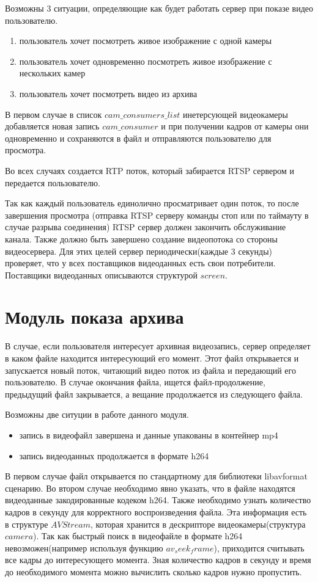 Возможны 3 ситуации, определяющие как будет работать сервер при показе видео пользователю.
\begin{enumerate}
	\item пользователь хочет посмотреть живое изображение с одной камеры
	\item пользователь хочет одновременно посмотреть живое изображение с нескольких камер
	\item пользователь хочет посмотреть видео из архива
\end{enumerate}

В первом случае в список $cam\_consumers\_list$ инетерсующей видеокамеры добавляется новая запись
$cam\_consumer$ и при получении кадров от камеры они одновременно и сохраняются в файл и отправляются
пользователю для просмотра.

Во всех случаях создается RTP поток, который забирается RTSP сервером и передается пользователю.

Так как каждый пользователь единолично просматривает один поток, то после завершения просмотра
(отправка RTSP серверу команды стоп или по таймауту в случае разрыва соединения) RTSP сервер
должен закончить обслуживание канала. Также должно быть завершено создание видеопотока со стороны видеосервера.
Для этих целей сервер периодически(каждые 3 секунды) проверяет, что у всех поставщиков
видеоданных есть свои потребители. Поставщики видеоданных описываются структурой $screen$.

\section{Модуль показа архива}
В случае, если пользователя интересует архивная видеозапись, сервер определяет в каком файле
находится интересующий его момент. Этот файл открывается и запускается новый поток, читающий видео
поток из файла и передающий его пользователю. В случае окончания файла, ищется файл-продолжение,
предыдущий файл закрывается, а вещание продолжается из следующего файла.

Возможны две ситуции в работе данного модуля.

\begin{itemize}
 \item запись в видеофайл завершена и данные упакованы в контейнер mp4
 \item запись видеоданных продолжается в формате h264
\end{itemize}

В первом случае файл открывается по стандартному для библиотеки libavformat сценарию.
Во втором случае необходимо явно указать, что в файле находятся видеоданные закодированные
кодеком h264. Также необходимо узнать количество кадров в секунду для корректного
воспроизведения файла. Эта информация есть в структуре $AVStream$, которая хранится
в дескрипторе видеокамеры(структура $camera$). Так как быстрый поиск в видеофайле в формате h264
невозможен(например используя функцию $av_seek_frame$), приходится считывать все кадры до
интересующего момента. Зная количество кадров в секунду и время до необходимого момента можно
вычислить сколько кадров нужно пропустить.

